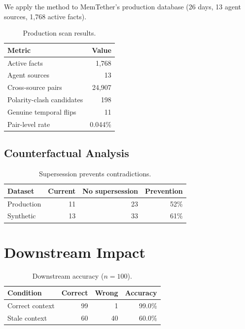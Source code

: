 \documentclass{article}
\begin{document}
We apply the method to MemTether's production database (26 days, 13 agent sources, 1{,}768 active facts).

\begin{table}[h]
\centering
\caption{Production scan results.}
\begin{tabular}{lr}
\toprule
Metric & Value \\
\midrule
Active facts & 1{,}768 \\
Agent sources & 13 \\
Cross-source pairs & 24{,}907 \\
Polarity-clash candidates & 198 \\
Genuine temporal flips & 11 \\
Pair-level rate & 0.044\% \\
\bottomrule
\end{tabular}
\label{tab:prod}
\end{table}

\subsection{Counterfactual Analysis}

\begin{table}[h]
\centering
\caption{Supersession prevents contradictions.}
\begin{tabular}{lrrr}
\toprule
Dataset & Current & No supersession & Prevention \\
\midrule
Production & 11 & 23 & 52\% \\
Synthetic & 13 & 33 & 61\% \\
\bottomrule
\end{tabular}
\label{tab:cf}
\end{table}

\section{Downstream Impact}

\begin{table}[h]
\centering
\caption{Downstream accuracy ($n{=}100$).}
\begin{tabular}{lrrr}
\toprule
Condition & Correct & Wrong & Accuracy \\
\midrule
Correct context & 99 & 1 & 99.0\% \\
Stale context & 60 & 40 & 60.0\% \\
\bottomrule
\end{tabular}
\label{tab:downstream}
\end{table}
\end{document}
